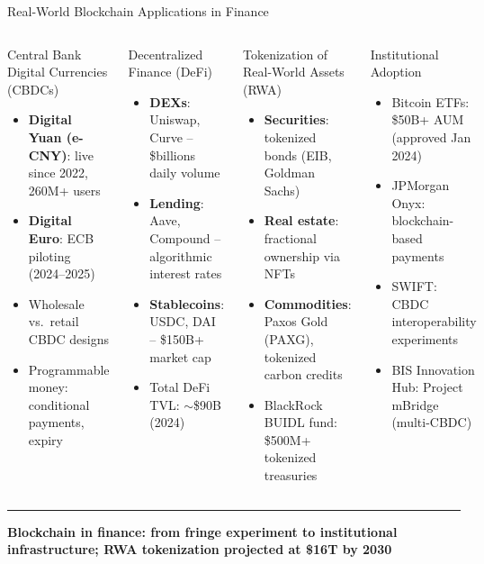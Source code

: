 \documentclass[8pt,aspectratio=169]{beamer}
\newcommand{\bottomnote}[1]{\vfill\vspace{-2mm}\textcolor{mllavender2}{\rule{\textwidth}{0.4pt}}\vspace{1mm}\footnotesize\textbf{#1}}
\begin{document}
\begin{frame}{Real-World Blockchain Applications in Finance}
\begin{columns}
\begin{block}{Central Bank Digital Currencies (CBDCs)}
\begin{itemize}\small
  \item \textbf{Digital Yuan (e-CNY)}: live since 2022, 260M+ users
  \item \textbf{Digital Euro}: ECB piloting (2024--2025)
  \item Wholesale vs.\ retail CBDC designs
  \item Programmable money: conditional payments, expiry
\end{itemize}
\end{block}
\vspace{2mm}
\begin{block}{Decentralized Finance (DeFi)}
\begin{itemize}\small
  \item \textbf{DEXs}: Uniswap, Curve -- \$billions daily volume
  \item \textbf{Lending}: Aave, Compound -- algorithmic interest rates
  \item \textbf{Stablecoins}: USDC, DAI -- \$150B+ market cap
  \item Total DeFi TVL: $\sim$\$90B (2024)
\end{itemize}
\end{block}
\begin{block}{Tokenization of Real-World Assets (RWA)}
\begin{itemize}\small
  \item \textbf{Securities}: tokenized bonds (EIB, Goldman Sachs)
  \item \textbf{Real estate}: fractional ownership via NFTs
  \item \textbf{Commodities}: Paxos Gold (PAXG), tokenized carbon credits
  \item BlackRock BUIDL fund: \$500M+ tokenized treasuries
\end{itemize}
\end{block}
\vspace{2mm}
\begin{block}{Institutional Adoption}
\begin{itemize}\small
  \item Bitcoin ETFs: \$50B+ AUM (approved Jan 2024)
  \item JPMorgan Onyx: blockchain-based payments
  \item SWIFT: CBDC interoperability experiments
  \item BIS Innovation Hub: Project mBridge (multi-CBDC)
\end{itemize}
\end{block}
\end{columns}
\bottomnote{Blockchain in finance: from fringe experiment to institutional infrastructure; RWA tokenization projected at \$16T by 2030}
\end{frame}
\end{document}
